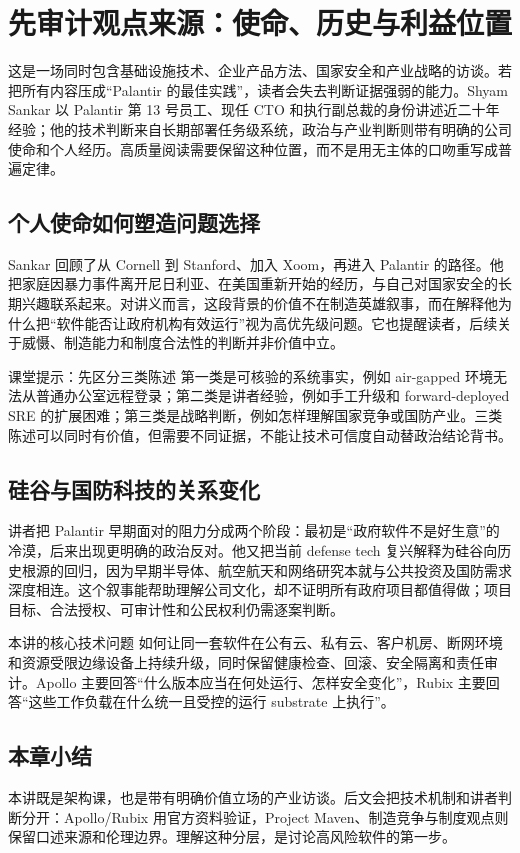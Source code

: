 \section{先审计观点来源：使命、历史与利益位置}

这是一场同时包含基础设施技术、企业产品方法、国家安全和产业战略的访谈。若把所有内容压成“Palantir 的最佳实践”，读者会失去判断证据强弱的能力。Shyam Sankar 以 Palantir 第 13 号员工、现任 CTO 和执行副总裁的身份讲述近二十年经验；他的技术判断来自长期部署任务级系统，政治与产业判断则带有明确的公司使命和个人经历。高质量阅读需要保留这种位置，而不是用无主体的口吻重写成普遍定律。

\subsection{个人使命如何塑造问题选择}

Sankar 回顾了从 Cornell 到 Stanford、加入 Xoom，再进入 Palantir 的路径。他把家庭因暴力事件离开尼日利亚、在美国重新开始的经历，与自己对国家安全的长期兴趣联系起来。对讲义而言，这段背景的价值不在制造英雄叙事，而在解释他为什么把“软件能否让政府机构有效运行”视为高优先级问题。它也提醒读者，后续关于威慑、制造能力和制度合法性的判断并非价值中立。

\begin{knowledgebox}{课堂提示：先区分三类陈述}
第一类是可核验的系统事实，例如 air-gapped 环境无法从普通办公室远程登录；第二类是讲者经验，例如手工升级和 forward-deployed SRE 的扩展困难；第三类是战略判断，例如怎样理解国家竞争或国防产业。三类陈述可以同时有价值，但需要不同证据，不能让技术可信度自动替政治结论背书。
\end{knowledgebox}

\subsection{硅谷与国防科技的关系变化}

讲者把 Palantir 早期面对的阻力分成两个阶段：最初是“政府软件不是好生意”的冷漠，后来出现更明确的政治反对。他又把当前 defense tech 复兴解释为硅谷向历史根源的回归，因为早期半导体、航空航天和网络研究本就与公共投资及国防需求深度相连。这个叙事能帮助理解公司文化，却不证明所有政府项目都值得做；项目目标、合法授权、可审计性和公民权利仍需逐案判断。

\begin{importantbox}{本讲的核心技术问题}
如何让同一套软件在公有云、私有云、客户机房、断网环境和资源受限边缘设备上持续升级，同时保留健康检查、回滚、安全隔离和责任审计。Apollo 主要回答“什么版本应当在何处运行、怎样安全变化”，Rubix 主要回答“这些工作负载在什么统一且受控的运行 substrate 上执行”。
\end{importantbox}

\subsection{本章小结}

本讲既是架构课，也是带有明确价值立场的产业访谈。后文会把技术机制和讲者判断分开：Apollo/Rubix 用官方资料验证，Project Maven、制造竞争与制度观点则保留口述来源和伦理边界。理解这种分层，是讨论高风险软件的第一步。

